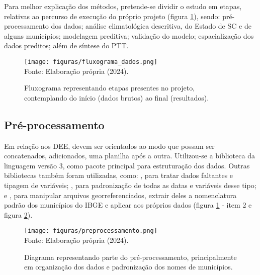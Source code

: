 \indent Para melhor explicação dos métodos, pretende-se dividir o estudo em etapas, relativas ao percurso de execução do próprio projeto (figura \ref{fig: fluxograma}), sendo: pré-processamento dos dados; análise climatológica descritiva, do Estado de \acrlong{SC} e de alguns municípios; modelagem preditiva; validação do modelo; espacialização dos dados preditos; além de síntese do \acrfull{PTT}.

\begin{figure}[htbp]
    \centering
    \caption{Fluxograma representando etapas presentes no projeto, contemplando do início (dados brutos) ao final (resultados).}
    \texttt{[image: figuras/fluxograma\_dados.png]}
    \label{fig: fluxograma}
    \\
    \vspace{-0.05cm}\hspace{-7.5cm}\small{Fonte: Elaboração própria (2024).} 
\end{figure}

\subsection{Pré-processamento}

Em relação aos \acrshort{DEE}, devem ser orientados ao modo que possam ser concatenados, adicionados, uma planilha após a outra. Utilizou-se a biblioteca  da linguagem  versão 3, como pacote principal para estruturação dos dados. Outras bibliotecas também foram utilizadas, como: , para tratar dados faltantes e tipagem de variáveis;  \cite{python2_1995_van}, para padronização de todas as datas e variáveis desse tipo; e , para manipular arquivos georreferenciados, extrair deles a nomenclatura padrão dos municípios do \acrshort{IBGE} e aplicar aos próprios dados (figura \ref{fig: fluxograma} - item 2 e figura \ref{fig: preprocessamento}).

\begin{figure}[htbp]
    \centering
    \caption{Diagrama representando parte do pré-processamento, principalmente em organização dos dados e padronização dos nomes de municípios.}
    \texttt{[image: figuras/preprocessamento.png]}
    \label{fig: preprocessamento}
    \\
    \vspace{-0.05cm}\hspace{-7.5cm}\small{Fonte: Elaboração própria (2024).} 
\end{figure}

